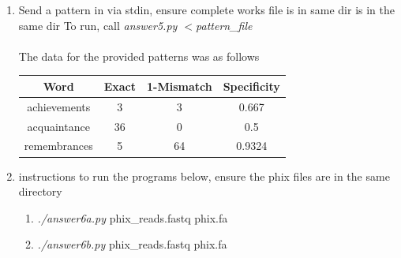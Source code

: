 \documentclass[12pt]{article}
\begin{document}
\begin{enumerate}
\begin{flushleft}
\begin{tabular}{ |c|c|c|c| }
        \hline
        \end{tabular}
        \end{flushleft}
    \pagebreak
    \item Send a pattern in via stdin, ensure complete works file is in same dir is in the same dir To run, call
        \textit{answer5.py $<$pattern\_file} \\ \\
        The data for the provided patterns was as follows \\
        \begin{flushleft}
            \begin{tabular}{ |c|c|c|c| }
            \hline
            \textbf{Word} & \textbf{Exact} & \textbf{1-Mismatch} & \textbf{Specificity} \\
            \hline
            achievements & 3 & 3 & 0.667 \\
            acquaintance & 36 & 0 & 0.5 \\
            remembrances & 5 & 64 & 0.9324 \\
            \hline
            \end{tabular}
            \end{flushleft}
    \item instructions to run the programs below, ensure the phix files are in the same directory
            \begin{enumerate}[label=(\alph*)]
                 \item \textit{./answer6a.py}  phix\_reads.fastq phix.fa 
                 \item \textit{./answer6b.py}  phix\_reads.fastq phix.fa 
            \end{enumerate}
\end{enumerate}



\end{document}
